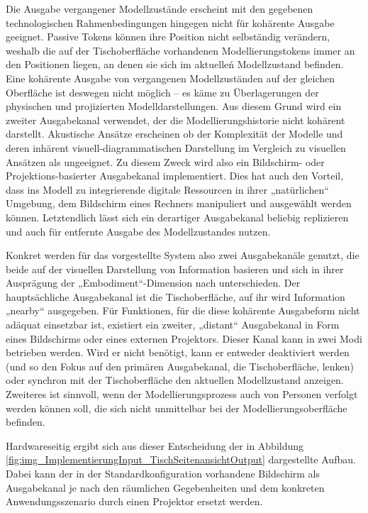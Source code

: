 Die Ausgabe vergangener Modellzustände erscheint mit den gegebenen technologischen Rahmenbedingungen hingegen nicht für kohärente Ausgabe geeignet. Passive Tokens können ihre Position nicht selbständig verändern, weshalb die auf der Tischoberfläche vorhandenen Modellierungstokens immer an den Positionen liegen, an denen sie sich im aktuelleń Modellzustand befinden. Eine kohärente Ausgabe von vergangenen Modellzuständen auf der gleichen Oberfläche ist deswegen nicht möglich -- es käme zu Überlagerungen der physischen und projizierten Modelldarstellungen. Aus diesem Grund wird ein zweiter Ausgabekanal verwendet, der die Modellierungshistorie nicht kohärent darstellt. Akustische Ansätze erscheinen ob der Komplexität der Modelle und deren inhärent visuell-diagrammatischen Darstellung im Vergleich zu visuellen Ansätzen als ungeeignet. Zu diesem Zweck wird also ein Bildschirm- oder Projektions-basierter Ausgabekanal implementiert. Dies hat auch den Vorteil, dass ins Modell zu integrierende digitale Ressourcen in ihrer „natürlichen“ Umgebung, dem Bildschirm eines Rechners manipuliert und ausgewählt werden können. Letztendlich lässt sich ein derartiger Ausgabekanal beliebig replizieren und auch für entfernte Ausgabe des Modellzustandes nutzen.

Konkret werden für das vorgestellte System also zwei Ausgabekanäle genutzt, die beide auf der visuellen Darstellung von Information basieren und sich in ihrer Ausprägung der „Embodiment“-Dimension nach \citet{Fishkin04} unterschieden. Der hauptsächliche Ausgabekanal ist die Tischoberfläche, auf ihr wird Information „nearby“ ausgegeben. Für Funktionen, für die diese kohärente Ausgabeform nicht adäquat einsetzbar ist, existiert ein zweiter, „distant“ Ausgabekanal in Form eines Bildschirms oder eines externen Projektors. Dieser Kanal kann in zwei Modi betrieben werden. Wird er nicht benötigt, kann er entweder deaktiviert werden (und so den Fokus auf den primären Ausgabekanal, die Tischoberfläche, lenken) oder synchron mit der Tischoberfläche den aktuellen Modellzustand anzeigen. Zweiteres ist sinnvoll, wenn der Modellierungsprozess auch von Personen verfolgt werden können soll, die sich nicht unmittelbar bei der Modellierungsoberfläche befinden. 

Hardwareseitig ergibt sich aus dieser Entscheidung der in Abbildung \ref{fig:img_ImplementierungInput_TischSeitenansichtOutput} dargestellte Aufbau. Dabei kann der in der Standardkonfiguration vorhandene Bildschirm als Ausgabekanal je nach den räumlichen Gegebenheiten und dem konkreten Anwendungsszenario durch einen Projektor ersetzt werden.

